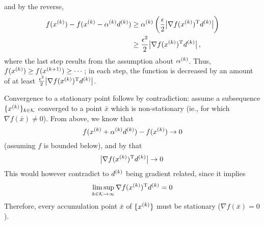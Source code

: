\documentclass{article}
\begin{document}
and by the reverse,
\begin{align*}
  f(\kth{x}) - f(\kth{x} - \kth{\alpha}\kth{d})
  &\geq \kth{\alpha} \left(\frac{\epsilon}{2}\envert[1]{\T{\nabla f(\kth{x})} \kth{d}} \right) \\
  &\geq \frac{\epsilon^2}{2}\envert[1]{\T{\nabla f(\kth{x})} \kth{d}},
\end{align*}
where the last step results from the assumption about \(\kth{\alpha}\).  Thus,
\(f(\kth{x}) \geq f(\kth[k+1]{x}) \geq \cdots \); in each step, the function is decreased by an
amount of at least \(\frac{\epsilon^2}{2}\envert[1]{\T{\nabla f(\kth{x})} \kth{d}}\).

Convergence to a stationary point follows by contradiction: assume a subsequence
\(\{\kth{x}\}_{k \in \mathcal{K}}\) converged to a point \(\bar{x}\) which is non-stationary (ie.,
for which \(\nabla f(\bar{x}) \neq 0\)).  From above, we know that
\begin{equation*}
  f(\kth{x} + \kth{\alpha}\kth{d}) - f(\kth{x}) \to 0
\end{equation*}
(assuming \(f\) is bounded below), and by that
\begin{equation*}
\envert[1]{\T{\nabla f(\kth{x})} \kth{d}} \to 0  
\end{equation*}
This would however contradict to \(\kth{d}\) being gradient related, since it implies
\begin{equation*}
  \limsup_{k \in \mathcal{K} \to \infty} \T{\nabla f(\kth{x})} \kth{d} = 0
\end{equation*}
Therefore, every accumulation point \(\bar{x}\) of \(\{\kth{x}\}\) must be stationary
(\(\nabla f(\bar{x}) = 0\)).


\label{s:convergence:armijo}


\label{s:convergence-rates}
\end{document}
